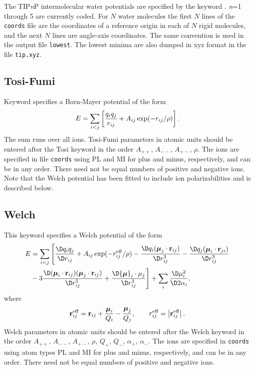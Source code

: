 The TIP{\it n\/}P intermolecular water potentials are specified by the keyword {\/}.
{\it n\/}=1 through 5 are currently coded. For $N$ water molecules the first $N$ lines of
the {\tt coords} file are the coordinates of a reference origin in each of $N$ rigid molecules,
and the next $N$ lines are angle-axis coordinates. The same convention is used in the output
file {\tt lowest}. The lowest minima are also dumped in xyz format in the file {\tt tip.xyz}.

\subsection{Tosi-Fumi}
 
Keyword {\/} specifies a Born-Mayer potential of the form
$$ E = \sum_{i<j}\left[ {q_i q_j\over r_{ij}} + A_{ij}\exp(-r_{ij}/\rho) \right]. $$
The sum runs over all ions. Tosi-Fumi\cite{tosif64} parameters in atomic units should be
entered after the Tosi keyword in the order $A_{++}$, $A_{--}$, $A_{+-}$, $\rho$.
The ions are specified in file {\tt coords} using PL and MI for plus and minus, respectively,
and can be in any order. There need not be equal numbers of positive and negative ions.
Note that the Welch potential has been fitted to include ion polarizabilities and is described below.

\subsection{Welch}This keyword specifies a Welch potential\cite{welchld76,phillipscb91} of the form
\begin{eqnarray*}
E &= \sum_{i<j}\Bigg[ {\D q_i q_j\over\D  r_{ij}} + A_{ij}\exp(-r_{ij}^{\rm eff}/\rho)
              -{\D q_i({\boldsymbol \mu}_j\cdot{\bf r}_{ij})\over\D  r_{ij}^3}
              -{\D q_j({\boldsymbol \mu}_i\cdot{\bf r}_{ji})\over\D  r_{ij}^3} \\
             &-3{\D   ({\boldsymbol \mu}_i\cdot{\bf r}_{ij})
                   ({\boldsymbol \mu}_j\cdot{\bf r}_{ij})\over\D  r_{ij}^5}
              +{\D  {\boldsymbol \mu}_i\cdot{{\bf{\mu}}}_j\over\D  r_{ij}^3}\Bigg]
              +\sum_i {\D \mu_i^2\over\D 2\alpha_i}, \\
\end{eqnarray*}
where
$$ {\bf r}_{ij}^{\rm eff}={\bf r}_{ij}+{{\boldsymbol \mu}_i\over Q_i}-{{\boldsymbol \mu}_j\over Q_j},
    \qquad r_{ij}^{\rm eff}=\left|{\bf r}_{ij}^{\rm eff}\right|. $$
Welch parameters in atomic units should be
entered after the Welch keyword in the order $A_{++}$, $A_{--}$, $A_{+-}$, $\rho$, $Q_+$,
$Q_-$, $\alpha_+$, $\alpha_-$.
The ions are specified in {\tt coords}  using atom types PL and MI for plus and minus, respectively,
and can be in any order. There need not be equal numbers of positive and negative ions.

